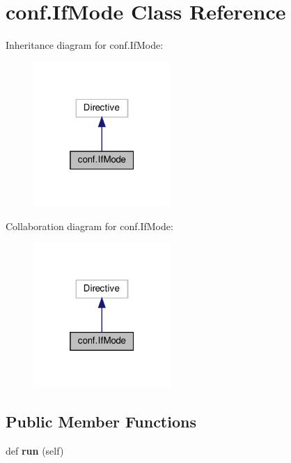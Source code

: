 \hypertarget{classconf_1_1IfMode}{}\section{conf.\+If\+Mode Class Reference}
\label{classconf_1_1IfMode}


Inheritance diagram for conf.\+If\+Mode\+:
\nopagebreak
\begin{figure}[H]
\begin{center}
\leavevmode
\includegraphics[width=148pt]{classconf_1_1IfMode__inherit__graph}
\end{center}
\end{figure}


Collaboration diagram for conf.\+If\+Mode\+:
\nopagebreak
\begin{figure}[H]
\begin{center}
\leavevmode
\includegraphics[width=148pt]{classconf_1_1IfMode__coll__graph}
\end{center}
\end{figure}
\subsection*{Public Member Functions}
\begin{DoxyCompactItemize}
\item 
\mbox{\label{classconf_1_1IfMode_a8734a7a8ad5f3c9832d0856b8470871c}} 
def {\bfseries run} (self)
\end{DoxyCompactItemize}
